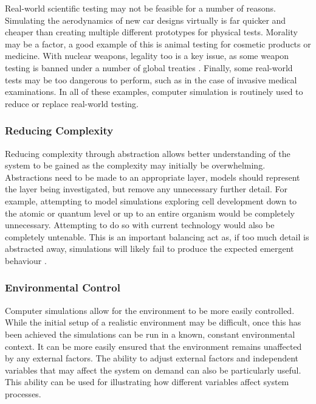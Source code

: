 \documentclass{UoYCSproject}
\begin{document}
Real-world scientific testing may not be feasible for a number of reasons.
Simulating the aerodynamics of new car designs virtually is far quicker and cheaper than creating multiple different prototypes for physical tests.
Morality may be a factor, a good example of this is animal testing for cosmetic products or medicine.
With nuclear weapons, legality too is a key issue, as some weapon testing is banned under a number of global treaties \cite{partial_nuclear_test_ban_treaty, threshold_test_ban_treaty}.
Finally, some real-world tests may be too dangerous to perform, such as in the case of invasive medical examinations.
In all of these examples, computer simulation is routinely used to reduce or replace real-world testing.

\subsubsection{Reducing Complexity}
Reducing complexity through abstraction allows better understanding of the system to be gained as the complexity may initially be overwhelming.
Abstractions need to be made to an appropriate layer, models should represent the layer being investigated, but remove any unnecessary further detail.
For example, attempting to model simulations exploring cell development down to the atomic or quantum level or up to an entire organism would be completely unnecessary.
Attempting to do so with current technology would also be completely untenable.
This is an important balancing act as, if too much detail is abstracted away, simulations will likely fail to produce the expected emergent behaviour \cite{stepney_abm}.

\subsubsection{Environmental Control}
Computer simulations allow for the environment to be more easily controlled.
While the initial setup of a realistic environment may be difficult, once this has been achieved the simulations can be run in a known, constant environmental context.
It can be more easily ensured that the environment remains unaffected by any external factors.
The ability to adjust external factors and independent variables that may affect the system on demand can also be particularly useful.
This ability can be used for illustrating how different variables affect system processes.
\end{document}
